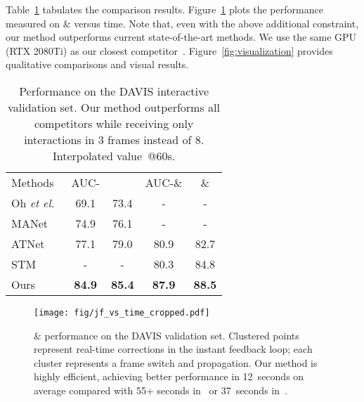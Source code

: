 \documentclass[final]{cvpr}
\begin{document}
	Table~\ref{tab:davis_interactive} tabulates the comparison results. Figure~\ref{fig:jf_vs_round} plots the performance measured on \& versus time. Note that, even with the above additional constraint, our method outperforms current state-of-the-art methods. We use the same GPU (RTX 2080Ti) as our closest competitor~\cite{oh2020STMPAMI}. Figure~\ref{fig:visualization} provides qualitative comparisons and visual results.
	
	\begin{table}[h]
		\vspace{-0.10in}
		\small
		\centering
		\begin{tabular}{l|c|c|c|c}
			\hline
			Methods & AUC- &  & AUC-\& & \& \\
			\Xhline{3\arrayrulewidth}
			Oh \textit{et el.}~\cite{oh2019fastInteractive} & 69.1 & 73.4 & - & - \\
			\hline
			MANet~\cite{miao2020memoryAggregationInteractive} & 74.9 & 76.1 & - & - \\
			\hline
			ATNet~\cite{Yuk2020IVOSGlobalLocal} & 77.1 & 79.0 & 80.9 & 82.7 \\
			\hline
			STM~\cite{oh2020STMPAMI} & - & - & 80.3 & 84.8 \\
			\hline
			Ours & \textbf{84.9} & \textbf{85.4} & \textbf{87.9} & \textbf{88.5} \\
			\hline
		\end{tabular}
		\caption{Performance on the DAVIS interactive validation set. Our method outperforms all competitors while receiving only interactions in 3 frames instead of 8. \textdagger Interpolated value~@60s.}
		\label{tab:davis_interactive}
		\vspace{-0.15in}
	\end{table}
	
	\begin{figure}[h]
		\begin{center}
			\texttt{[image: fig/jf\_vs\_time\_cropped.pdf]}
		\end{center}
		\vspace{-0.15in}
		\caption{\& performance on the DAVIS validation set. Clustered points represent real-time corrections in the instant feedback loop; each cluster represents a frame switch and propagation. Our method is highly efficient, achieving better performance in 12~seconds on average compared with 55+ seconds in~\cite{Yuk2020IVOSGlobalLocal} or 37~seconds in~\cite{oh2020STMPAMI}.}
		\label{fig:jf_vs_round}
		\vspace{-0.15in}
	\end{figure}
	
\end{document}
